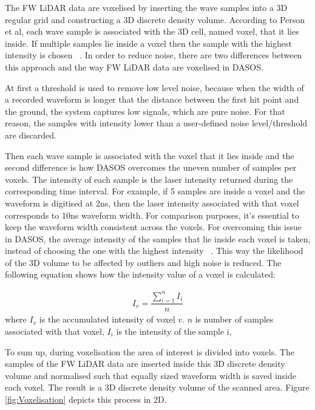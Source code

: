 \documentclass{subfiles}
\begin{document}
\par The FW LiDAR data are voxelised by inserting the wave samples into a 3D regular grid and constructing a 3D discrete density volume. According to Person et al, each wave sample is associated with the 3D cell, named voxel, that it lies inside. If multiple samples lie inside a voxel then the sample with the highest intensity is chosen ~\cite{Persson2005}. In order to reduce noise, there are two differences between this approach and the way FW LiDAR data are voxelised in DASOS. 

\par At first a threshold is used to remove low level noise, because when the width of a recorded waveform is longer that the distance between the first hit point and the ground, the system captures low signals, which are pure noise. For that reason, the samples with intensity lower than a user-defined noise level/threshold are discarded. 

\par Then each wave sample is associated with the voxel that it lies inside and the second difference is how DASOS overcomes the uneven number of samples per voxels. The intensity of each sample is the laser intensity returned during the corresponding time interval. For example, if 5 samples are inside a voxel and the waveform is digitised at 2ns, then the laser intensity associated with that voxel corresponds to 10ns waveform width. For comparison purposes, it's essential to keep the waveform width consistent across the voxels. For overcoming this issue in DASOS, the average intensity of the samples that lie inside each voxel is taken, instead of choosing the one with the highest intensity ~\cite{Persson2005}. This way the likelihood of the 3D volume to be affected by outliers and high noise is reduced. The following equation shows how the intensity value of a voxel is calculated:
 
	\begin{eqnarray}
	I_{v} = \dfrac{\sum_{i=1}^{n}I_{i}}{n}
	\end{eqnarray} 
	where 		$I_{v}$ is the accumulated intensity of voxel $v$. 
	$n$ is number of samples associated with that voxel, 
	$I_{i}$ is the intensity of the sample i, 

To sum up, during voxelisation the area of interest is divided into voxels. The samples of the FW LiDAR data are inserted inside this 3D discrete density volume and normalised such that equally sized waveform width is saved inside each voxel. The result is a 3D discrete density volume of the scanned area. Figure \ref{fig:Voxelisation} depicts this process in 2D.
\end{document}
